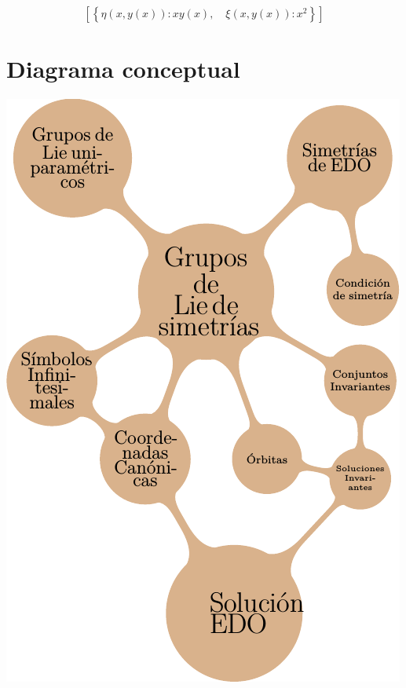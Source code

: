 \[\left [ \left \{ \eta{\left (x,y{\left (x \right )} \right )} : x y{\left (x \right )}, \quad \xi{\left (x,y{\left (x \right )} \right )} : x^{2}\right \}\right ]\]



\section{Diagrama conceptual}

\begin{center}
 \includegraphics[scale=.25]{imagenes/diagrama.png}
\end{center}


